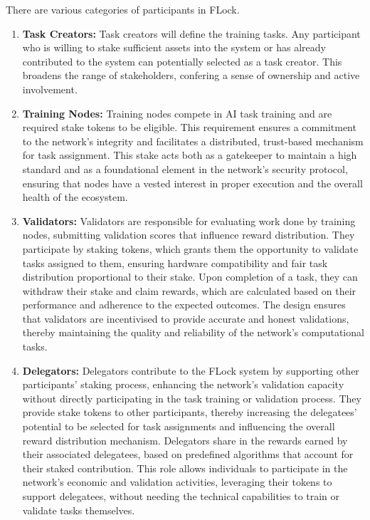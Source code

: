 \documentclass[conference]{IEEEtran}
\begin{document}
There are various categories of participants in FLock.
\begin{enumerate}
    \item \textbf{Task Creators:} Task creators will define the training tasks. Any participant who is willing to stake sufficient assets into the system or has already contributed to the system can potentially selected as a task creator. This broadens the range of stakeholders, confering a sense of ownership and active involvement.
    
    \item \textbf{Training Nodes:} Training nodes compete in AI task training and are required stake tokens to be eligible. This requirement ensures a commitment to the network's integrity and facilitates a distributed, trust-based mechanism for task assignment. This stake acts both as a gatekeeper to maintain a high standard and as a foundational element in the network's security protocol, ensuring that nodes have a vested interest in proper execution and the overall health of the ecosystem.


    \item \textbf{Validators:} Validators are responsible for evaluating work done by training nodes, submitting validation scores that influence reward distribution.  They participate by staking tokens, which grants them the opportunity to validate tasks assigned to them, ensuring hardware compatibility and fair task distribution proportional to their stake.  Upon completion of a task, they can withdraw their stake and claim rewards, which are calculated based on their performance and adherence to the expected outcomes. The design ensures that validators are incentivised to provide accurate and honest validations, thereby maintaining the quality and reliability of the network's computational tasks.
    
    \item \textbf{Delegators:} Delegators contribute to the FLock system by supporting other participants' staking process, enhancing the network's validation capacity without directly participating in the task training or validation process. They provide stake tokens to other participants, thereby increasing the delegatees' potential to be selected for task assignments and influencing the overall reward distribution mechanism. Delegators share in the rewards earned by their associated delegatees, based on predefined algorithms that account for their staked contribution. This role allows individuals to participate in the network's economic and validation activities, leveraging their tokens to support delegatees, without needing the technical capabilities to train or validate tasks themselves.


\end{enumerate}
\end{document}
